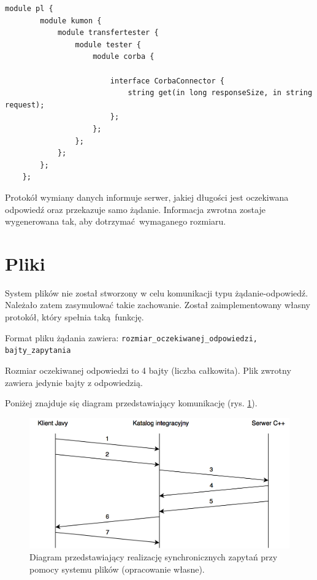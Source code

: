 \begin{lstlisting}[caption={Zastosowany interfejs (IDL).},captionpos=b]
    module pl {
        module kumon {
            module transfertester {
                module tester {
                    module corba {

                        interface CorbaConnector {
                            string get(in long responseSize, in string request);
                        };
                    };
                };
            };
        };
    };
\end{lstlisting}

Protokół wymiany danych informuje serwer, jakiej długości jest oczekiwana odpowiedź oraz przekazuje samo żądanie. Informacja zwrotna zostaje wygenerowana tak, aby dotrzymać wymaganego rozmiaru.


\section{Pliki}

System plików nie został stworzony w celu komunikacji typu żądanie-odpowiedź. Należało zatem zasymulować takie zachowanie. Został zaimplementowany własny protokół, który spełnia taką funkcję.

Format pliku żądania zawiera:
\newline
\texttt{rozmiar\_oczekiwanej\_odpowiedzi, bajty\_zapytania}

Rozmiar oczekiwanej odpowiedzi to 4 bajty (liczba całkowita). Plik zwrotny zawiera jedynie bajty z odpowiedzią.

Poniżej znajduje się diagram przedstawiający komunikację (rys. \ref{fig:filesystem_sync}).

\begin{figure}[h!]
    \centering
    \includegraphics[width=\textwidth,height=\textheight,keepaspectratio]{img/files_impl_diagram.png}
    \caption{Diagram przedstawiający realizację synchronicznych zapytań przy pomocy systemu plików (opracowanie własne).}
    \label{fig:filesystem_sync}
\end{figure}


